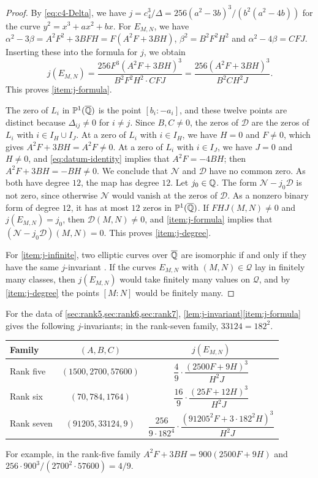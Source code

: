 \begin{proof}
By \eqref{eq:c4-Delta}, we have $j=c_4^3/\Delta=256(a^2-3b)^3/(b^2(a^2-4b))$ for the curve $y^2=x^3+ax^2+bx$. For $E_{M,N}$, we have $\alpha^2-3\beta=A^2F^2+3BFH=F(A^2F+3BH)$, $\beta^2=B^2F^2H^2$ and $\alpha^2-4\beta=CFJ$. Inserting these into the formula for $j$, we obtain
\begin{equation}
j(E_{M,N})=\frac{256F^3(A^2F+3BH)^3}{B^2F^2H^2\cdot CFJ}=\frac{256(A^2F+3BH)^3}{B^2CH^2J}.
\end{equation}
This proves \ref{item:j-formula}.

The zero of $L_i$ in $\mathbb P^1(\overline{\mathbb Q})$ is the point $[b_i:-a_i]$, and these twelve points are distinct because $\Delta_{ij}\ne0$ for $i\ne j$. Since $B,C\ne0$, the zeros of $\mathcal D$ are the zeros of $L_i$ with $i\in I_H\cup I_J$. At a zero of $L_i$ with $i\in I_H$, we have $H=0$ and $F\ne0$, which gives $A^2F+3BH=A^2F\ne0$. At a zero of $L_i$ with $i\in I_J$, we have $J=0$ and $H\ne0$, and \eqref{eq:datum-identity} implies that $A^2F=-4BH$; then $A^2F+3BH=-BH\ne0$. We conclude that $\mathcal N$ and $\mathcal D$ have no common zero. As both have degree $12$, the map has degree $12$. Let $j_0\in\mathbb Q$. The form $\mathcal N-j_0\mathcal D$ is not zero, since otherwise $\mathcal N$ would vanish at the zeros of $\mathcal D$. As a nonzero binary form of degree $12$, it has at most $12$ zeros in $\mathbb P^1(\overline{\mathbb Q})$. If $FHJ(M,N)\ne0$ and $j(E_{M,N})=j_0$, then $\mathcal D(M,N)\ne0$, and \ref{item:j-formula} implies that $(\mathcal N-j_0\mathcal D)(M,N)=0$. This proves \ref{item:j-degree}.

For \ref{item:j-infinite}, two elliptic curves over $\overline{\mathbb Q}$ are isomorphic if and only if they have the same $j$-invariant \cite[Proposition~III.1.4(b)]{SilvermanAEC}. If the curves $E_{M,N}$ with $(M,N)\in\mathcal Q$ lay in finitely many classes, then $j(E_{M,N})$ would take finitely many values on $\mathcal Q$, and by \ref{item:j-degree} the points $[M:N]$ would be finitely many.
\end{proof}

\begin{remark}\label{rem:j-families}
For the data of \cref{sec:rank5,sec:rank6,sec:rank7}, \cref{lem:j-invariant}\ref{item:j-formula} gives the following $j$-invariants; in the rank-seven family, $33124=182^2$.
\begin{center}
\begin{tabular}{lcc}
\toprule
Family & $(A,B,C)$ & $j(E_{M,N})$\\
\midrule
Rank five & $(1500,2700,57600)$ & $\dfrac49\cdot\dfrac{(2500F+9H)^3}{H^2J}$\\[8pt]
Rank six & $(70,784,1764)$ & $\dfrac{16}9\cdot\dfrac{(25F+12H)^3}{H^2J}$\\[8pt]
Rank seven & $(91205,33124,9)$ & $\dfrac{256}{9\cdot182^4}\cdot\dfrac{(91205^2F+3\cdot182^2H)^3}{H^2J}$\\
\bottomrule
\end{tabular}
\end{center}
For example, in the rank-five family $A^2F+3BH=900(2500F+9H)$ and $256\cdot900^3/(2700^2\cdot57600)=4/9$.
\end{remark}

